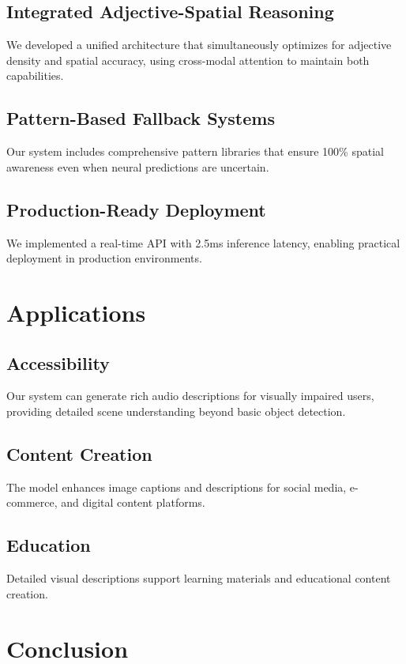 \documentclass[10pt]{article}
\begin{document}
\subsection{Integrated Adjective-Spatial Reasoning}
We developed a unified architecture that simultaneously optimizes for adjective density and spatial accuracy, using cross-modal attention to maintain both capabilities.

\subsection{Pattern-Based Fallback Systems}
Our system includes comprehensive pattern libraries that ensure 100\% spatial awareness even when neural predictions are uncertain.

\subsection{Production-Ready Deployment}
We implemented a real-time API with 2.5ms inference latency, enabling practical deployment in production environments.

\section{Applications}

\subsection{Accessibility}
Our system can generate rich audio descriptions for visually impaired users, providing detailed scene understanding beyond basic object detection.

\subsection{Content Creation}
The model enhances image captions and descriptions for social media, e-commerce, and digital content platforms.

\subsection{Education}
Detailed visual descriptions support learning materials and educational content creation.

\section{Conclusion}
\end{document}
